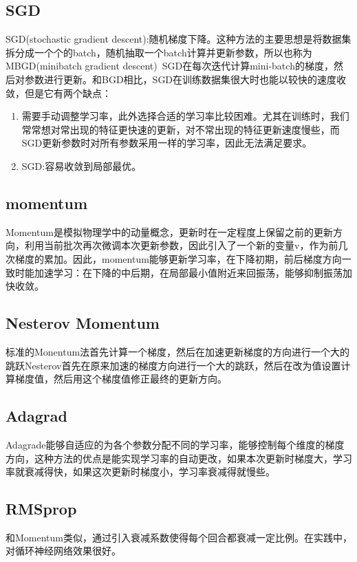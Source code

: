 \subsection{SGD}
SGD(stochastic gradient descent):随机梯度下降。这种方法的主要思想是将数据集拆分成一个个的batch，随机抽取一个batch计算并更新参数，所以也称为MBGD(minibatch gradient descent)\
SGD在每次迭代计算mini-batch的梯度，然后对参数进行更新。和BGD相比，SGD在训练数据集很大时也能以较快的速度收敛，但是它有两个缺点：
\begin{enumerate}
\item 需要手动调整学习率，此外选择合适的学习率比较困难。尤其在训练时，我们常常想对常出现的特征更快速的更新，对不常出现的特征更新速度慢些，而SGD更新参数时对所有参数采用一样的学习率，因此无法满足要求。
\item SGD:容易收敛到局部最优。
\end{enumerate}
\subsection{momentum}
Momentum是模拟物理学中的动量概念，更新时在一定程度上保留之前的更新方向，利用当前批次再次微调本次更新参数，因此引入了一个新的变量v，作为前几次梯度的累加。因此，momentum能够更新学习率，在下降初期，前后梯度方向一致时能加速学习：在下降的中后期，在局部最小值附近来回振荡，能够抑制振荡加快收敛。
\subsection{Nesterov Momentum}
标准的Monentum法首先计算一个梯度，然后在加速更新梯度的方向进行一个大的跳跃Nesterov首先在原来加速的梯度方向进行一个大的跳跃，然后在改为值设置计算梯度值，然后用这个梯度值修正最终的更新方向。
\subsection{Adagrad}
Adagrade能够自适应的为各个参数分配不同的学习率，能够控制每个维度的梯度方向，这种方法的优点是能实现学习率的自动更改，如果本次更新时梯度大，学习率就衰减得快，如果这次更新时梯度小，学习率衰减得就慢些。
\subsection{RMSprop}
和Momentum类似，通过引入衰减系数使得每个回合都衰减一定比例。在实践中，对循环神经网络效果很好。
